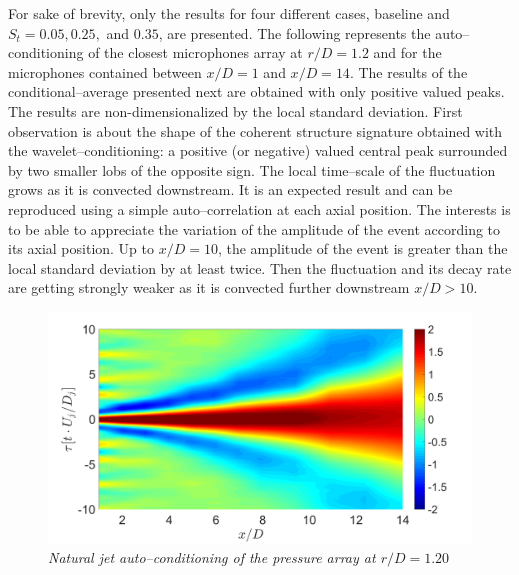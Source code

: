For sake of brevity, only the results for four different cases, baseline and $S_t = 0.05, 0.25,$ and $0.35$, are presented. The following  represents the auto--conditioning of the closest microphones array at $r/D = 1.2$ and for the microphones contained between $x/D=1$ and $x/D=14$. The results of the conditional--average presented next are obtained with only positive valued peaks. The results are non-dimensionalized by the local standard deviation. First observation is about the shape of the coherent structure signature obtained with the wavelet--conditioning: a positive (or negative) valued central peak surrounded by two smaller lobs of the opposite sign. The local time--scale of the fluctuation grows as it is convected downstream. It is an expected result and can be reproduced using a simple auto--correlation at each axial position. The interests is to be able to appreciate the variation of the amplitude of the event according to its axial position. Up to $x/D=10$, the amplitude of the event is greater than the local standard deviation by at least twice. Then the fluctuation and its decay rate are getting strongly weaker as it is convected further downstream $x/D > 10$. 

\begin{figure}
	\centering
	\includegraphics[width=1\textwidth]{Figures/conditioning/autoCondSt0p00.png}
	\caption{\textit{Natural jet auto--conditioning of the pressure array at $r/D = 1.20$}}
	\label{fig:autoCondSt0p00}
\end{figure}

